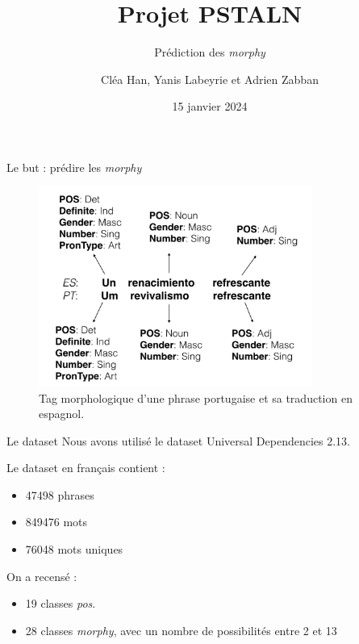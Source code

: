 \documentclass[11pt]{beamer}
\title{Projet PSTALN}
\subtitle{Prédiction des \textit{morphy}}
\author{Cléa Han, Yanis Labeyrie et Adrien Zabban}
\date{15 janvier 2024}
\begin{document}
\maketitle

\begin{frame}{Le but : prédire les \textit{morphy}}
    \begin{figure}[b]
        \centering
        \includegraphics[width=0.8\textwidth]{morphy.png}
        \caption{Tag morphologique d'une phrase portugaise et sa traduction en espagnol.}
    \end{figure}
\end{frame}

\begin{frame}{Le dataset}
    Nous avons utilisé le dataset Universal Dependencies 2.13.

    Le dataset en français contient :
    \begin{itemize}
        \item 47498 phrases
        \item 849476 mots
        \item 76048 mots uniques
    \end{itemize}

    On a recensé :
    \begin{itemize}
        \item 19 classes \textit{pos}.
        \item 28 classes \textit{morphy}, avec un nombre de possibilités entre 2 et 13
    \end{itemize}
\end{frame}
\end{document}
